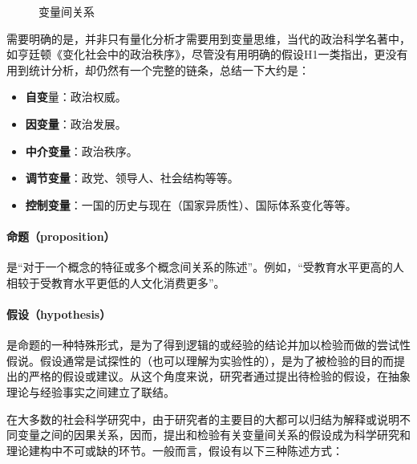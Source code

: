 \begin{figure}[htbp]
	\centering
	\caption[变量间关系]{变量间关系}
	\label{fig:relation}
\end{figure}

需要明确的是，并非只有量化分析才需要用到变量思维，当代的政治科学名著中，如亨廷顿《变化社会中的政治秩序》，尽管没有用明确的假设H1一类指出，更没有用到统计分析，却仍然有一个完整的链条，总结一下大约是：

\begin{itemize}
	\item \textbf{自变}量：政治权威。
	\item \textbf{因变量}：政治发展。
	\item \textbf{中介变量}：政治秩序。
	\item \textbf{调节变量}：政党、领导人、社会结构等等。
	\item \textbf{控制变量}：一国的历史与现在（国家异质性）、国际体系变化等等。
\end{itemize}

\paragraph*{命题（proposition）}

是``对于一个概念的特征或多个概念间关系的陈述''。例如，``受教育水平更高的人相较于受教育水平更低的人文化消费更多''。

\paragraph*{假设（hypothesis）}

是命题的一种特殊形式，是为了得到逻辑的或经验的结论并加以检验而做的尝试性假说。假设通常是试探性的（也可以理解为实验性的），是为了被检验的目的而提出的严格的假设或建议。从这个角度来说，研究者通过提出待检验的假设，在抽象理论与经验事实之间建立了联结。

在大多数的社会科学研究中，由于研究者的主要目的大都可以归结为解释或说明不同变量之间的因果关系，因而，提出和检验有关变量间关系的假设成为科学研究和理论建构中不可或缺的环节。一般而言，假设有以下三种陈述方式：

